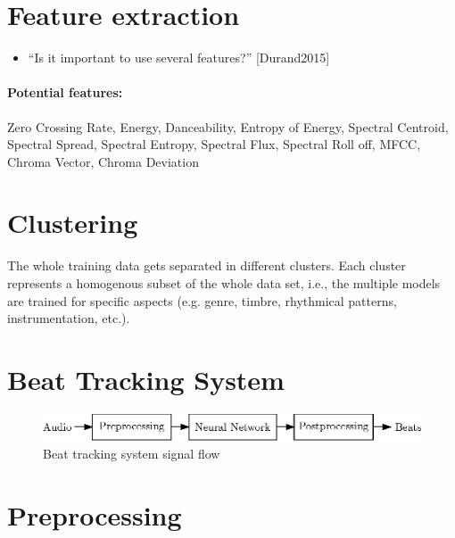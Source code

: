 \documentclass{article}
\begin{document}
\section{Feature extraction}

\begin{itemize}
\item ``Is it important to use several features?'' [Durand2015]
\end{itemize}


\paragraph{Potential features:} Zero Crossing Rate, Energy, Danceability, Entropy of Energy, Spectral Centroid, Spectral Spread, Spectral Entropy, Spectral Flux, Spectral Roll off, MFCC, Chroma Vector, Chroma Deviation



\section{Clustering}
The whole training data gets separated in different clusters. Each cluster represents a homogenous subset of the whole data set, i.e., the multiple models are trained for specific aspects (e.g. genre, timbre, rhythmical patterns, instrumentation, etc.). 


\section{Beat Tracking System}

\begin{figure}[htbp]
\centering
\includegraphics[scale=1.0]{figures/beat_tracking_system.eps}
\caption{Beat tracking system signal flow}
\label{fig:}
\end{figure}	

\section{Preprocessing}
\end{document}

